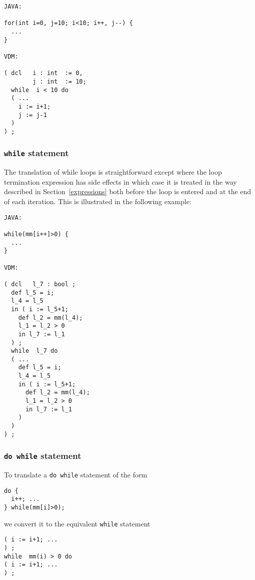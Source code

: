 \documentclass[\pformat,12pt]{article}
\begin{document}
\begin{small}
\begin{verbatim}
JAVA:

for(int i=0, j=10; i<10; i++, j--) {
  ...
}

VDM:

( dcl   i : int  := 0,
        j : int  := 10;
  while  i < 10 do  
  ( ...
    i := i+1;
    j := j-1
  ) 
) ;
\end{verbatim}
\end{small}

\subsubsection{\texttt{while} statement}

The translation of while loops is straightforward except where the
loop termination expression has side effects in which case it is
treated in the way described in Section~\ref{expressions} both before
the loop is entered and at the end of each iteration. This is
illustrated in the following example:

\begin{small}
\begin{verbatim}
JAVA:

while(mm[i++]>0) {
  ...
}

VDM:

( dcl   l_7 : bool ;
  def l_5 = i;
  l_4 = l_5
  in ( i := l_5+1;
    def l_2 = mm(l_4);
    l_1 = l_2 > 0
    in l_7 := l_1
  ) ;
  while  l_7 do  
  ( ...
    def l_5 = i;
    l_4 = l_5
    in ( i := l_5+1;
      def l_2 = mm(l_4);
      l_1 = l_2 > 0
      in l_7 := l_1
    ) 
  ) 
) ;
\end{verbatim}
\end{small}

\subsubsection{\texttt{do while} statement}

To translate a \texttt{do while} statement of the form 

\begin{small}
\begin{verbatim}
do {
  i++; ... 
} while(mm[i]>0);
\end{verbatim}
\end{small}

we convert it to the equivalent \texttt{while} statement 

\begin{small}
\begin{verbatim}
( i := i+1; ...
) ;
while  mm(i) > 0 do  
( i := i+1; ...
) ;
\end{verbatim}
\end{small}
\end{document}
